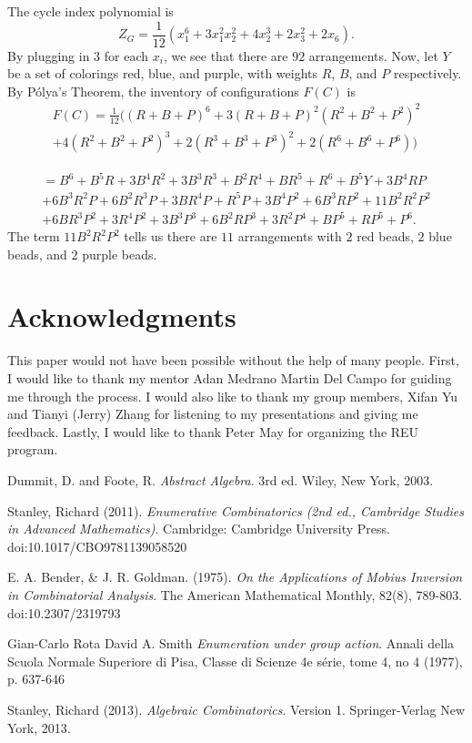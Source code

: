 \documentclass[psamsfonts]{amsart}
\theoremstyle{definition}
\theoremstyle{remark}
\numberwithin{equation}{section}
\begin{document}
\indent The cycle index polynomial is 
\begin{equation*}
    Z_G=\frac{1}{12}(x_1^6 +3x_1^2x_2^2 + 4x_2^3 +2x_3^2 + 2x_6).
\end{equation*}
By plugging in $3$ for each $x_i$, we see that there are $92$ arrangements. Now, let $Y$ be a set of colorings red, blue, and purple, with weights $R$, $B$, and $P$ respectively. By P\'{o}lya's Theorem, the inventory of configurations $F(C)$ is 
\begin{multline*}
    F(C) = \frac{1}{12}((R+B+P)^6 + 3(R+B+P)^2(R^2+B^2+P^2)^2\\
             +4(R^2+B^2+P^2)^3 +2(R^3+B^3+P^3)^2 +2(R^6+B^6+P^6))
\end{multline*}

\begin{multline*}
    = B^6 +B^5R +3B^4R^2 +3B^3R^3 + B^2R^4 +BR^5 +R^6 +B^5Y +3B^4RP \\
     +6B^3R^2P + 6B^2R^3P + 3BR^4P + R^5P + 3B^4P^2 + 6B^3RP^2 + 11B^2R^2P^2  \\
     + 6BR^3P^2 +3R^4P^2 +3B^3P^3 +6B^2RP^3+3R^2P^4+BP^5+RP^5+P^6.
\end{multline*}
    The term $11B^2R^2P^2$ tells us there are $11$ arrangements with $2$ red beads, $2$ blue beads, and $2$ purple beads.
\section*{Acknowledgments}  
This paper would not have been possible without the help of many people. First, I would like to thank my mentor Adan Medrano Martin Del Campo for guiding me through the process. I would also like to thank my group members, Xifan Yu and Tianyi (Jerry) Zhang for listening to my presentations and giving me feedback. Lastly, I would like to thank Peter May for organizing the REU program.

\begin{thebibliography}{9}
Dummit, D. and Foote, R. \textit{Abstract Algebra}. 3rd ed. Wiley, New York, 2003.

Stanley, Richard (2011). \textit{Enumerative Combinatorics (2nd ed., Cambridge Studies in Advanced Mathematics)}. Cambridge: Cambridge University Press. doi:10.1017/CBO9781139058520

E. A. Bender, \& J. R. Goldman. (1975). \textit{On the Applications of Mobius Inversion in Combinatorial Analysis}. The American Mathematical Monthly, 82(8), 789-803. doi:10.2307/2319793

Gian-Carlo Rota
David A. Smith
\textit{Enumeration under group action}.
Annali della Scuola Normale Superiore di Pisa, Classe di Scienze 4e série, tome 4, no 4
(1977), p. 637-646

Stanley, Richard (2013). \textit{Algebraic Combinatorics}. Version 1. Springer-Verlag New York, 2013.



\end{thebibliography}
\end{document}
